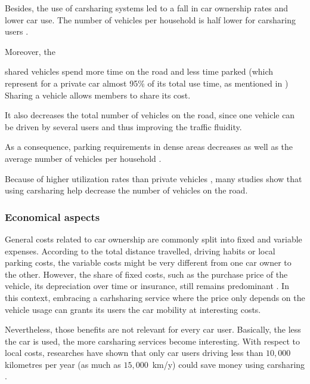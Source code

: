 \begin{bibunit}[ieeetr]
Besides, the use of carsharing systems led to a fall in car ownership rates and lower car use.
The number of vehicles per household is half lower for carsharing users \cite{martin_impact_2010, ter_schure_cumulative_2012}.

Moreover, the 


 shared vehicles spend more time on the road and less time parked (which represent for a private car almost 95\% of its total use time, as mentioned in \cite{transflash_2013})
Sharing a vehicle allows members to share its cost.




It also decreases the total number of vehicles on the road, since one vehicle can be driven by several users and thus improving the traffic fluidity.




As a consequence, parking requirements in dense areas decreases \cite{mitchell_reinventing_2010} as well as the average number of vehicles per household \cite{martin_impact_2010, ter_schure_cumulative_2012}.

Because of higher utilization rates than private vehicles \cite{litman_evaluating_2000, schuster_assessing_2005}, many studies show that using carsharing help decrease the number of vehicles on the road.

\subsubsection{Economical aspects}
General costs related to car ownership are commonly split into fixed and variable expenses.
According to the total distance travelled, driving habits or local parking costs, the variable costs might be very different from one car owner to the other.
However, the share of fixed costs, such as the purchase price of the vehicle, its depreciation over time or insurance, still remains predominant \cite{cout_reel_auto}.
In this context, embracing a carhsharing service where the price only depends on the vehicle usage can grants its users the car mobility at interesting costs.

\medskip
Nevertheless, those benefits are not relevant for every car user.
Basically, the less the car is used, the more carsharing services become interesting.
With respect to local costs, researches have shown that only car users driving less than $10,000$ kilometres per year (as much as \hbox{$15,000$ km/y}) could save money using carsharing \cite{litman_evaluating_2000, prettenthaler_ownership_1999}.


\end{bibunit}

